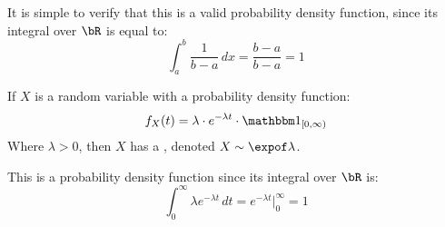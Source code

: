 It is simple to verify that this is a valid probability density function, since its integral over $\bR$ is equal to:
\[ \int_a^b\frac1{b-a}\,dx = \frac{b-a}{b-a} = 1 \]

\begin{defn*}

	If $X$ is a random variable with a probability density function:
	\[ f_X(t) = \lambda\cdot e^{-\lambda t}\cdot\bone_{[0,\infty)} \]
	Where $\lambda>0$, then $X$ has a , denoted $X\sim\expof\lambda$.

\end{defn*}

This is a probability density function since its integral over $\bR$ is:
\[ \int_0^\infty \lambda e^{-\lambda t}\,dt = e^{-\lambda t}\big|_0^\infty = 1 \]

